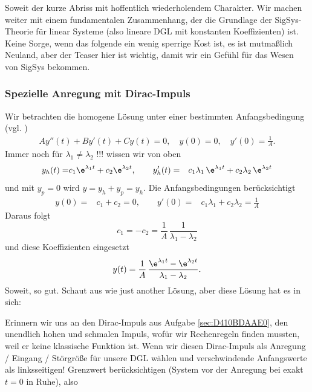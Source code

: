 Soweit der kurze Abriss mit hoffentlich wiederholendem Charakter.
%
Wir machen weiter mit einem fundamentalen Zusammenhang, der die Grundlage der
SigSys-Theorie für linear Systeme (also lineare DGL mit konstanten Koeffizienten)
ist.
%
Keine Sorge, wenn das folgende ein wenig sperrige Kost ist, es ist mutmaßlich
Neuland, aber der Teaser hier ist wichtig, damit wir ein Gefühl für das Wesen von SigSys
bekommen.

\subsubsection{Spezielle Anregung mit Dirac-Impuls}
Wir betrachten die homogene Lösung unter einer bestimmten Anfangsbedingung
(vgl. \cite[S.97]{Strang2014})
\begin{align}
A y''(t) + B y'(t) + C y(t) = 0,\quad y(0)=0,\quad y'(0)=\frac{1}{A}.
\end{align}
%
Immer noch für $\lambda_1 \neq \lambda_2$ !!! wissen wir von oben
\begin{align}
y_h(t) = &c_1 \e^{\lambda_1 t} + c_2 \e^{\lambda_2 t},\qquad
y_h'(t) = &c_1 \lambda_1 \, \e^{\lambda_1 t} + c_2 \lambda_2 \, \e^{\lambda_2 t}
\end{align}
und mit $y_p=0$ wird $y=y_h+y_p=y_h$.
Die Anfangsbedingungen berücksichtigt
\begin{align}
y(0) = &c_1 + c_2 = 0,\qquad
y'(0) = &c_1 \lambda_1 + c_2 \lambda_2 = \frac{1}{A}
\end{align}
Daraus folgt
\begin{equation}
c_1 = -c_2 = \frac{1}{A} \, \frac{1}{\lambda_1 - \lambda_2}
\end{equation}
und diese Koeffizienten eingesetzt
\begin{align}
\label{sec:A7BEE9E24E_hyh}
y(t) =
\frac{1}{A} \, \frac{\e^{\lambda_1 t} - \e^{\lambda_2 t}}{\lambda_1 - \lambda_2}.
\end{align}
%
Soweit, so gut. Schaut aus wie just another Lösung, aber diese Lösung hat es in sich:
%

Erinnern wir uns an den Dirac-Impuls aus Aufgabe \ref{sec:D410BDAAE0},
den unendlich hohen und schmalen Impuls,
wofür wir Rechenregeln finden mussten, weil er keine klassische Funktion ist.
%
Wenn wir diesen Dirac-Impuls als Anregung / Eingang / Störgröße für unsere DGL
wählen und verschwindende Anfangswerte als linksseitigen! Grenzwert
berücksichtigen (System vor der Anregung bei exakt $t=0$ in Ruhe), also

